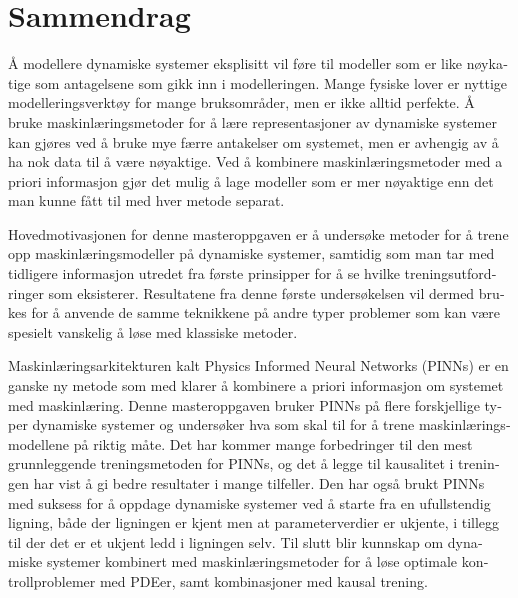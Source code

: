 \chapter*{Sammendrag}
\begin{otherlanguage}{norsk}

Å modellere dynamiske systemer eksplisitt vil føre til modeller som er like nøykatige som antagelsene som gikk inn i modelleringen. Mange fysiske lover er nyttige modelleringsverktøy for mange bruksområder, men er ikke alltid perfekte. Å bruke maskinlæringsmetoder for å lære representasjoner av dynamiske systemer kan gjøres ved å bruke mye færre antakelser om systemet, men er avhengig av å ha nok data til å være nøyaktige. Ved å kombinere maskinlæringsmetoder med a priori informasjon gjør det mulig å lage modeller som er mer nøyaktige enn det man kunne fått til med hver metode separat.

Hovedmotivasjonen for denne masteroppgaven er å undersøke metoder for å trene opp maskinlæringsmodeller på dynamiske systemer, samtidig som man tar med tidligere informasjon utredet fra første prinsipper for å se hvilke treningsutfordringer som eksisterer. Resultatene fra denne første undersøkelsen vil dermed brukes for å anvende de samme teknikkene på andre typer problemer som kan være spesielt vanskelig å løse med klassiske metoder.

Maskinlæringsarkitekturen kalt Physics Informed Neural Networks (PINNs) er en ganske ny metode som med klarer å kombinere a priori informasjon om systemet med maskinlæring. Denne masteroppgaven bruker PINNs på flere forskjellige typer dynamiske systemer og undersøker hva som skal til for å trene maskinlæringsmodellene på riktig måte. Det har kommer mange forbedringer til den mest grunnleggende treningsmetoden for PINNs, og det å legge til kausalitet i treningen har vist å gi bedre resultater i mange tilfeller. Den har også brukt PINNs med suksess for å oppdage dynamiske systemer ved å starte fra en ufullstendig ligning, både der ligningen er kjent men at parameterverdier er ukjente, i tillegg til der det er et ukjent ledd i ligningen selv. Til slutt blir kunnskap om dynamiske systemer kombinert med maskinlæringsmetoder for å løse optimale kontrollproblemer med PDEer, samt kombinasjoner med kausal trening.

\end{otherlanguage}
